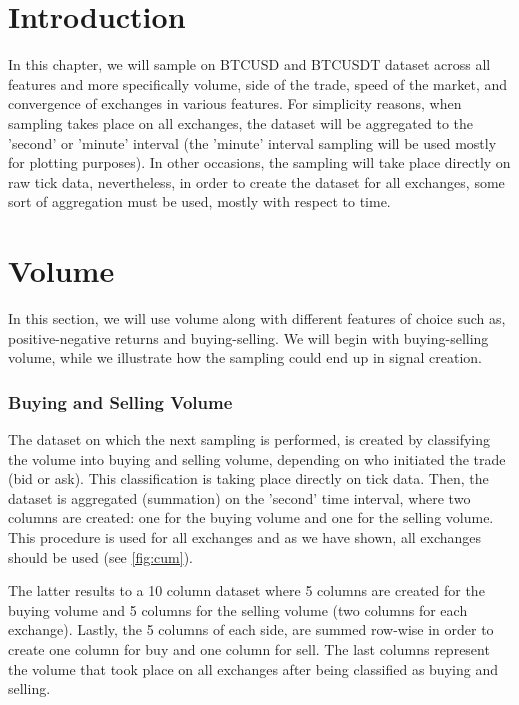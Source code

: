 
\section{Introduction}

In this chapter, we will sample on BTCUSD and BTCUSDT dataset across all features and more specifically volume, side of the trade, speed of the market, and convergence of exchanges in various features. For simplicity reasons, when sampling takes place on all exchanges, the dataset will be aggregated to the 'second' or 'minute' interval (the 'minute' interval sampling will be used mostly for plotting purposes). In other occasions, the sampling will take place directly on raw tick data, nevertheless, in order to create the dataset for all exchanges, some sort of aggregation must be used, mostly with respect to time.

\section{Volume}

In this section, we will use volume along with different features of choice such as, positive-negative returns and buying-selling. We will begin with buying-selling volume, while we illustrate how the sampling could end up in signal creation.

\subsubsection{Buying and Selling Volume}

The dataset on which the next sampling is performed, is created by classifying the volume into buying and selling volume, depending on who initiated the trade (bid or ask). This classification is taking place directly on tick data. Then, the dataset is aggregated (summation) on the 'second' time interval, where two columns are created: one for the buying volume and one for the selling volume. This procedure is used for all exchanges and as we have shown, all exchanges should be used (see \ref{fig:cum}). 

The latter results to a 10 column dataset where 5 columns are created for the buying volume and 5 columns for the selling volume (two columns for each exchange). Lastly, the 5 columns of each side, are summed row-wise in order to create one column for buy and one column for sell. The last columns represent the volume that took place on all exchanges after being classified as buying and selling.

